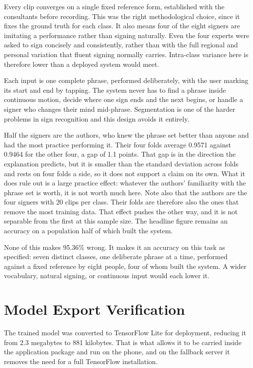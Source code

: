 Every clip converges on a single fixed reference form, established with the consultants
before recording. This was the right methodological choice, since it fixes the ground truth
for each class. It also means four of the eight signers are imitating a performance
rather than signing naturally. Even the four experts were asked to sign concisely and
consistently, rather than with the full regional and personal variation that fluent
signing normally carries. Intra-class variance here is therefore lower than a deployed system would
meet.

Each input is one complete phrase, performed deliberately, with the user marking its start
and end by tapping. The system never has to find a phrase inside continuous motion, decide
where one sign ends and the next begins, or handle a signer who changes their mind
mid-phrase. Segmentation is one of the harder problems in sign recognition and this design
avoids it entirely.

Half the signers are the authors, who knew the phrase set better than anyone and had the
most practice performing it. Their four folds average 0.9571 against 0.9464 for the other
four, a gap of 1.1 points. That gap is in the direction the explanation predicts, but it is
smaller than the standard deviation across folds and rests on four folds a side, so it does
not support a claim on its own. What it does rule out is a large practice effect: whatever
the authors' familiarity with the phrase set is worth, it is not worth much here. Note also
that the authors are the four signers with 20 clips per class. Their folds are therefore also
the ones that remove the most training data. That effect pushes the other way, and it is not
separable from the first at this sample size. The headline figure remains an accuracy on a
population half of which built the system.

None of this makes 95.36\% wrong. It makes it an accuracy on this task as specified:
seven distinct classes, one deliberate phrase at a time, performed against a fixed
reference by eight people, four of whom built the system. A wider vocabulary, natural
signing, or continuous input would each lower it.

\section{Model Export Verification}
\label{sec:exportverify}

The trained model was converted to TensorFlow Lite for deployment, reducing it from 2.3 megabytes to 881 kilobytes. That is what allows it to be carried inside the application package and run on the phone, and on the fallback server it removes the need for a full TensorFlow installation.

